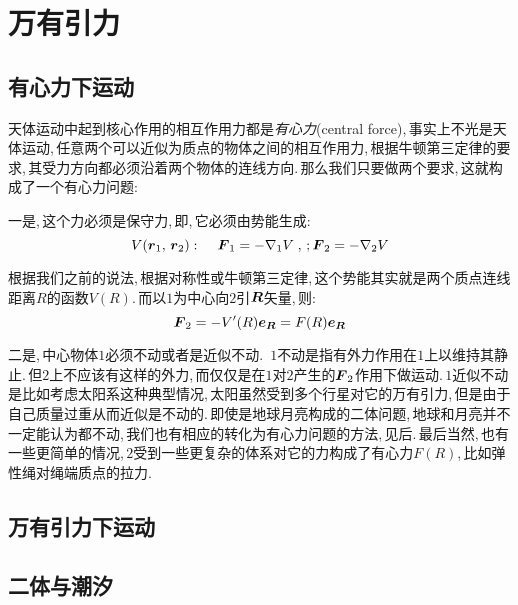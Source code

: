 \chapter{万有引力}


\section{有心力下运动}

天体运动中起到核心作用的相互作用力都是\emph{有心力}(central force),\,事实上不光是天体运动,\,任意两个可以近似为质点的物体之间的相互作用力,\,根据牛顿第三定律的要求,\,其受力方向都必须沿着两个物体的连线方向.\,那么我们只要做两个要求,\,这就构成了一个有心力问题:

一是,\,这个力必须是保守力,\,即,\,它必须由势能生成:
\[V(\boldsymbol{r}_1,\,\boldsymbol{r}_2):\quad\,\boldsymbol{F}_1=-\nabla_1V\;,\,; \boldsymbol{F}_2=-\nabla_2V\]

根据我们之前的说法,\,根据对称性或牛顿第三定律,\,这个势能其实就是两个质点连线距离$R$的函数$V(R)$.\,而以$1$为中心向$2$引$\boldsymbol{R}$矢量,\,则:
\[\boldsymbol{F}_2=-V'(R)\boldsymbol{e}_{\boldsymbol{R}}=F(R)\boldsymbol{e}_{\boldsymbol{R}}\]

二是,\,中心物体$1$必须不动或者是近似不动.\, $1$不动是指有外力作用在$1$上以维持其静止.\,但$2$上不应该有这样的外力,\,而仅仅是在$1$对$2$产生的$\boldsymbol{F}_2$作用下做运动.\,$1$近似不动是比如考虑太阳系这种典型情况,\,太阳虽然受到多个行星对它的万有引力,\,但是由于自己质量过重从而近似是不动的.\,即使是地球月亮构成的二体问题,\,地球和月亮并不一定能认为都不动,\,我们也有相应的转化为有心力问题的方法,\,见后.\,最后当然,\,也有一些更简单的情况,\,$2$受到一些更复杂的体系对它的力构成了有心力$F(R)$,\,比如弹性绳对绳端质点的拉力.



\section{万有引力下运动}

\section{二体与潮汐}

